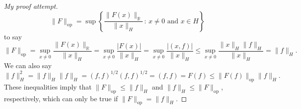 \documentclass[11pt]{article}
\theoremstyle{definition}
\begin{document}
\begin{proof}[My proof attempt]
	\begin{equation*}
		\|F\|_{\text{op}} = \sup\left\{\frac{\|F(x)\|_{\mathbb{R}}}{\|x\|_H}\, : \, x \not= 0 \text{ and } x \in H\right\}
	\end{equation*}
	to say
	\begin{equation*}
		\|F\|_{\text{op}} = \sup_{x\not=0}{\frac{\|F(x)\|_{\mathbb{R}}}{\|x\|_H}} = \sup_{x\not=0}{\frac{|F(x)|}{\|x\|_H}} = \sup_{x\not=0}{\frac{|(x,f)|}{\|x\|_H}} \leq \sup_{x\not=0}{\frac{\|x\|_H\|f\|_H}{\|x\|_H}} = \|f\|_H.
	\end{equation*}
	We can also say
	\begin{equation*}
		\|f\|_H^2 = \|f\|_H\|f\|_H = (f,f)^{1/2}(f,f)^{1/2} = (f,f) = F(f) \leq \|F(f)\|_{\text{op}}\|f\|_H.
	\end{equation*}
	These inequalities imply that $\|F\|_{\text{op}} \leq \|f\|_H$ and $\|f\|_H \leq \|F\|_{\text{op}}$, respectively, which can only be true if $\|F\|_{\text{op}} = \|f\|_H$.
\end{proof}
\end{document}
